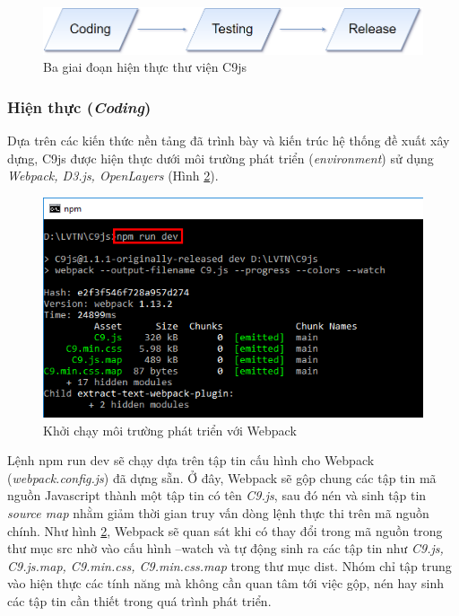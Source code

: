 \documentclass[12pt,a4paper,twoside]{article}
\begin{document}
\begin{figure}[!h]
	\begin{center}
    \includegraphics[scale=0.4]{image/implementation}
    \caption{Ba giai đoạn hiện thực thư viện C9js}
    \label{fig:implementation}
	\end{center}
\end{figure}

\subsubsection{Hiện thực (\textit{Coding})}
Dựa trên các kiến thức nền tảng đã trình bày và kiến trúc hệ thống đề xuất xây dựng, C9js được hiện thực dưới môi trường phát triển (\textit{environment}) sử dụng \textit{Webpack, D3.js, OpenLayers} (Hình \ref{fig:webpack_1}).

\begin{figure}[!h]
	\begin{center}
    \includegraphics[scale=1]{image/webpack_1}
    \caption{Khởi chạy môi trường phát triển với Webpack}
    \label{fig:webpack_1}
	\end{center}
\end{figure}

Lệnh \textsf{npm run dev} sẽ chạy dựa trên tập tin cấu hình cho Webpack (\textit{webpack.config.js}) đã dựng sẵn. Ở đây, Webpack sẽ gộp chung các tập tin mã nguồn Javascript thành một tập tin có tên \textit{C9.js}, sau đó nén và sinh tập tin \textit{source map}\cite{source_map} nhằm giảm thời gian truy vấn dòng lệnh thực thi trên mã nguồn chính. Như hình \ref{fig:webpack_1}, Webpack sẽ quan sát khi có thay đổi trong mã nguồn trong thư mục \textsf{src} nhờ vào cấu hình \textsf{--watch} và tự động sinh ra các tập tin như \textit{C9.js, C9.js.map, C9.min.css, C9.min.css.map} trong thư mục \textsf{dist}. Nhóm chỉ tập trung vào hiện thực các tính năng mà không cần quan tâm tới việc gộp, nén hay sinh các tập tin cần thiết trong quá trình phát triển.
\end{document}
